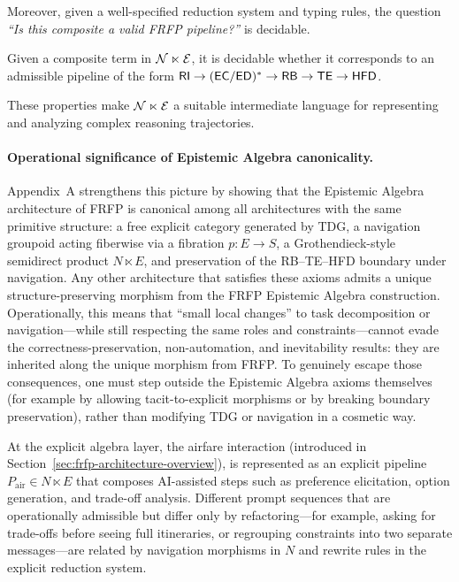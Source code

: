 Moreover, given a well-specified reduction system and typing rules, the question \emph{``Is this composite a valid FRFP pipeline?''} is decidable.


\begin{theorem}
Given a composite term in \(\mathcal{N} \ltimes \mathcal{E}\), it is decidable
whether it corresponds to an admissible pipeline of the form
\(\mathsf{RI} \to (\mathsf{EC}/\mathsf{ED})^\ast \to \mathsf{RB} \to \mathsf{TE} \to \mathsf{HFD}\).
\end{theorem}

These properties make \(\mathcal{N} \ltimes \mathcal{E}\) a suitable intermediate
language for representing and analyzing complex reasoning trajectories.
\paragraph{Operational significance of Epistemic Algebra canonicality.}
Appendix~A strengthens this picture by showing that the Epistemic Algebra architecture of FRFP is
canonical among all architectures with the same primitive structure: a free explicit category
generated by TDG, a navigation groupoid acting fiberwise via a fibration $p : E \to S$, a
Grothendieck-style semidirect product $N \ltimes E$, and preservation of the RB--TE--HFD
boundary under navigation. Any other architecture that satisfies these axioms admits a unique
structure-preserving morphism from the FRFP Epistemic Algebra construction. Operationally, this means
that ``small local changes'' to task decomposition or navigation---while still respecting the same
roles and constraints---cannot evade the correctness-preservation, non-automation, and
inevitability results: they are inherited along the unique morphism from FRFP. To genuinely
escape those consequences, one must step outside the Epistemic Algebra axioms themselves (for example
by allowing tacit-to-explicit morphisms or by breaking boundary preservation), rather than
modifying TDG or navigation in a cosmetic way.

At the explicit algebra layer, the airfare interaction (introduced in Section~\ref{sec:frfp-architecture-overview}), is represented as an explicit pipeline \(P_{\mathrm{air}} \in N \ltimes E\) that composes AI-assisted steps such as preference elicitation, option generation, and trade-off analysis. Different prompt sequences that are operationally admissible but differ only by refactoring---for example, asking for trade-offs before seeing full itineraries, or regrouping constraints into two separate messages---are related by navigation morphisms in \(N\) and rewrite rules in the explicit reduction system.
 
